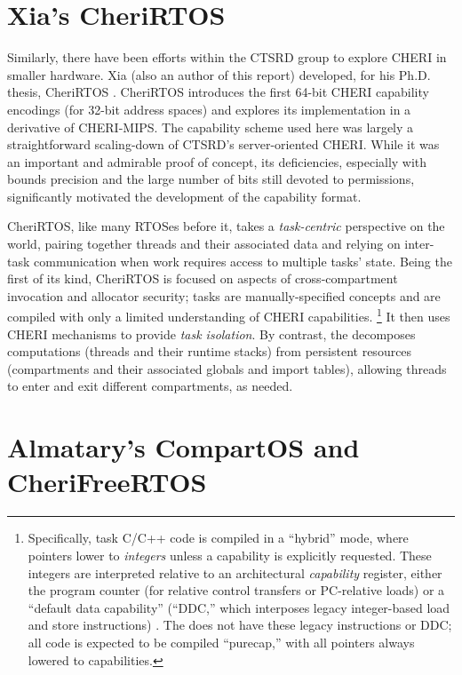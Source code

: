 \section{Xia's CheriRTOS}

Similarly, there have been efforts within the CTSRD group to explore CHERI in smaller hardware.
Xia (also an author of this report) developed, for his Ph.D. thesis, CheriRTOS \cite{xia:cherirtos,xia:capprotembed}.
CheriRTOS introduces the first 64-bit CHERI capability encodings (for 32-bit address spaces) and explores its implementation in a derivative of CHERI-MIPS.
The capability scheme used here was largely a straightforward scaling-down of CTSRD's server-oriented CHERI.
While it was an important and admirable proof of concept, its deficiencies, especially with bounds precision and the large number of bits still devoted to permissions, significantly motivated the development of the \cherimcuisa{} capability format.

CheriRTOS, like many RTOSes before it, takes a \emph{task-centric} perspective on the world, pairing together threads and their associated data and relying on inter-task communication when work requires access to multiple tasks' state.
Being the first of its kind, CheriRTOS is focused on aspects of cross-compartment invocation and allocator security; tasks are manually-specified concepts and are compiled with only a limited understanding of CHERI capabilities.%
%
\footnote{Specifically, task C/C++ code is compiled in a ``hybrid'' mode, where pointers lower to \emph{integers} unless a capability is explicitly requested.
These integers are interpreted relative to an architectural \emph{capability} register, either the program counter (for relative control transfers or PC-relative loads) or a ``default data capability'' (``DDC,'' which interposes legacy integer-based load and store instructions) \cite[\S 2.3.12]{UCAM-CL-TR-951}.
The \cherimcuisa{} does not have these legacy instructions or DDC; all \cherimcuos{} code is expected to be compiled ``purecap,'' with all pointers always lowered to capabilities.}
%
It then uses CHERI mechanisms to provide \emph{task isolation}.
By contrast, the \cherimcuos{} decomposes computations (threads and their runtime stacks) from persistent resources (compartments and their associated globals and import tables), allowing threads to enter and exit different compartments, as needed.

\section{Almatary's CompartOS and CheriFreeRTOS}

